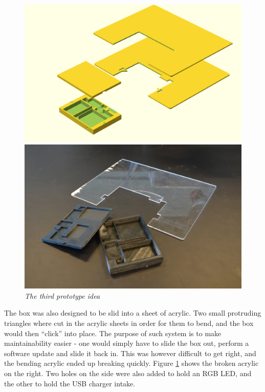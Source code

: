 \begin{figure}[h]
\setlength{\belowcaptionskip}{0mm}
\begin{minipage}[b]{.5\textwidth}
\includegraphics[width=1.05\textwidth]{figures/iterations/v4.png}
\end{minipage}
\begin{minipage}[b]{.5\textwidth}
\includegraphics[width=1\textwidth]{figures/iterations/v4-photo.jpg}
\end{minipage}
\caption{\small {\it {The third prototype idea}}} 
\label{fig:v3}
\end{figure}

The box was also designed to be slid into a sheet of acrylic. Two small protruding triangles where cut in the acrylic sheets in order for them to bend, and the box would then ``click'' into place. The purpose of such system is to make maintainability easier - one would simply have to slide the box out, perform a software update and slide it back in. This was however difficult to get right, and the bending acrylic ended up breaking quickly. Figure \ref{fig:v3} shows the broken acrylic on the right. Two holes on the side were also added to hold an RGB LED, and the other to hold the USB charger intake.

